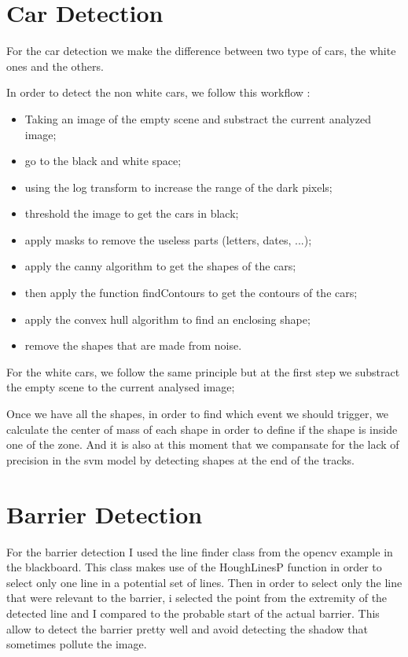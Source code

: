 \documentclass{report}
\begin{document}
\section{Car Detection}
For the car detection we make the difference between two type of cars, the white ones and the others.

In order to detect the non white cars, we follow this workflow :
\begin{itemize}
  \item Taking an image of the empty scene and substract the current analyzed image;
  \item go to the black and white space;
  \item using the log transform to increase the range of the dark pixels;
  \item threshold the image to get the cars in black;
  \item apply masks to remove the useless parts (letters, dates, ...);
  \item apply the canny algorithm to get the shapes of the cars;
  \item then apply the function findContours to get the contours of the cars;
  \item apply the convex hull algorithm to find an enclosing shape;
  \item remove the shapes that are made from noise.
\end{itemize}

For the white cars, we follow the same principle but at the first step we substract the empty scene to the current analysed image;

Once we have all the shapes, in order to find which event we should trigger, we calculate the center of mass of each shape in order to define if the shape is inside one of the zone. And it is also at this moment that we compansate for the lack of precision in the svm model by detecting shapes at the end of the tracks.



\section{Barrier Detection}

For the barrier detection I used the line finder class from the opencv example in the blackboard. This class makes use of the HoughLinesP function in order to select only one line in a potential set of lines. Then in order to select only the line that were relevant to the barrier, i selected the point from the extremity of the detected line and I compared to the probable start of the actual barrier.
This allow to detect the barrier pretty well and avoid detecting the shadow that sometimes pollute the image.
\end{document}
